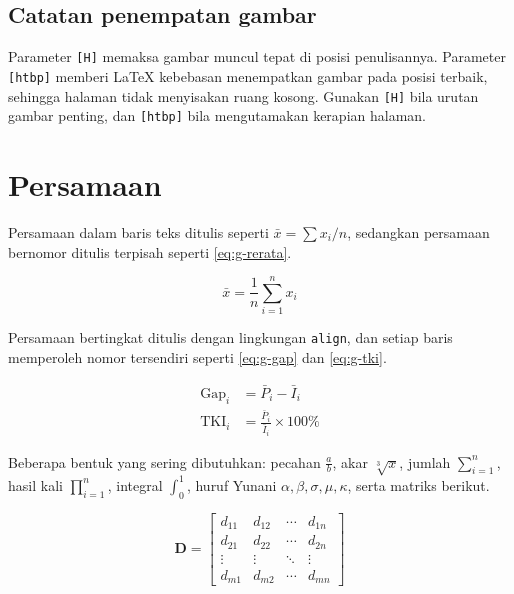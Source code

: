 \subsection{Catatan penempatan gambar}
Parameter \texttt{[H]} memaksa gambar muncul tepat di posisi penulisannya.
Parameter \texttt{[htbp]} memberi LaTeX kebebasan menempatkan gambar pada
posisi terbaik, sehingga halaman tidak menyisakan ruang kosong. Gunakan
\texttt{[H]} bila urutan gambar penting, dan \texttt{[htbp]} bila
mengutamakan kerapian halaman.

\section{Persamaan}

Persamaan dalam baris teks ditulis seperti $\bar{x} = \sum x_i / n$, sedangkan
persamaan bernomor ditulis terpisah seperti \cref{eq:g-rerata}.

\begin{equation}
    \label{eq:g-rerata}
    \bar{x} = \frac{1}{n}\sum_{i=1}^{n} x_{i}
\end{equation}

Persamaan bertingkat ditulis dengan lingkungan \texttt{align}, dan setiap baris
memperoleh nomor tersendiri seperti \cref{eq:g-gap} dan \cref{eq:g-tki}.

\begin{align}
    \text{Gap}_i &= \bar{P}_i - \bar{I}_i \label{eq:g-gap} \\
    \text{TKI}_i &= \frac{\bar{P}_i}{\bar{I}_i} \times 100\% \label{eq:g-tki}
\end{align}

Beberapa bentuk yang sering dibutuhkan: pecahan $\frac{a}{b}$, akar
$\sqrt[3]{x}$, jumlah $\sum_{i=1}^{n}$, hasil kali $\prod_{i=1}^{n}$, integral
$\int_{0}^{1}$, huruf Yunani $\alpha, \beta, \sigma, \mu, \kappa$, serta matriks
berikut.

\begin{equation}
    \label{eq:g-matriks}
    \mathbf{D} =
    \begin{bmatrix}
        d_{11} & d_{12} & \cdots & d_{1n} \\
        d_{21} & d_{22} & \cdots & d_{2n} \\
        \vdots & \vdots & \ddots & \vdots \\
        d_{m1} & d_{m2} & \cdots & d_{mn}
    \end{bmatrix}
\end{equation}


